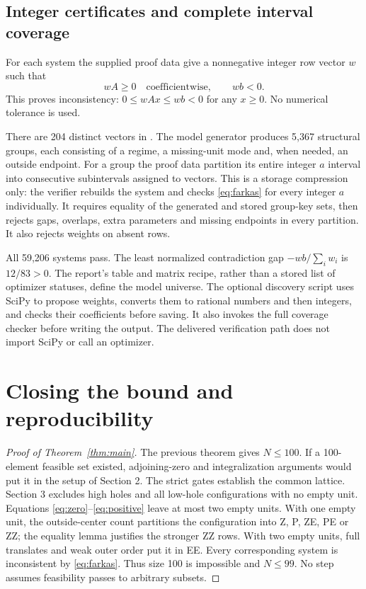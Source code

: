 \documentclass[11pt,a4paper]{article}
\begin{document}
\subsection{Integer certificates and complete interval coverage}
For each system the supplied proof data give a nonnegative integer row
vector $w$ such that
\begin{equation}\label{eq:farkas}
 wA\ge0\quad\text{coefficientwise},\qquad wb<0.
\end{equation}
This proves inconsistency: $0\le wAx\le wb<0$ for any $x\ge0$.
No numerical tolerance is used.

There are 204 distinct vectors in
. The model generator produces 5,367
structural groups, each consisting of a regime, a missing-unit mode and,
when needed, an outside endpoint. For a group the proof data partition
its entire integer $a$ interval into consecutive subintervals assigned
to vectors. This is a storage compression only: the verifier rebuilds
the system and checks \eqref{eq:farkas} for every integer $a$ individually.
It requires equality of the generated and stored group-key sets, then
rejects gaps, overlaps, extra parameters and missing endpoints in every
partition. It also rejects weights on absent rows.

All 59,206 systems pass. The least normalized contradiction gap
$-wb/\sum_iw_i$ is $12/83>0$. The report's table and matrix recipe, rather
than a stored list of optimizer statuses, define the model universe.
The optional discovery script uses SciPy to propose weights, converts
them to rational numbers and then integers, and checks their coefficients
before saving. It also invokes the full coverage checker before writing
the output. The delivered verification path does not import SciPy or
call an optimizer.

\section{Closing the bound and reproducibility}
\begin{proof}[Proof of Theorem~\ref{thm:main}]
The previous theorem gives $N\le100$. If a 100-element feasible set
existed, adjoining-zero and integralization arguments would put it in
the setup of Section 2. The strict gates establish the common lattice.
Section 3 excludes high holes and all low-hole configurations with no
empty unit. Equations \eqref{eq:zero}--\eqref{eq:positive} leave at most
two empty units. With one empty unit, the outside-center count partitions
the configuration into Z, P, ZE, PE or ZZ; the equality lemma justifies
the stronger ZZ rows. With two empty units, full translates and weak
outer order put it in EE. Every corresponding system is inconsistent
by \eqref{eq:farkas}. Thus size 100 is impossible and $N\le99$.
No step assumes feasibility passes to arbitrary subsets.
\end{proof}
\end{document}
